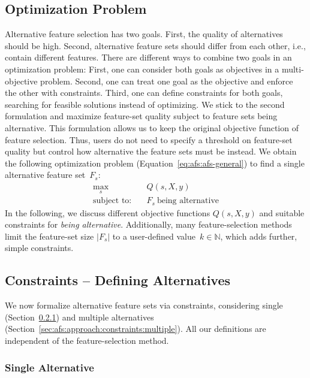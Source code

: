 \documentclass[iicol, sn-basic, Numbered]{sn-jnl} %
\theoremstyle{plain}
\theoremstyle{definition}
\begin{document}
\subsection{Optimization Problem}
\label{sec:afs:approach:problem}

Alternative feature selection has two goals.
First, the quality of alternatives should be high.
Second, alternative feature sets should differ from each other, i.e., contain different features.
There are different ways to combine two goals in an optimization problem:
First, one can consider both goals as objectives in a multi-objective problem.
Second, one can treat one goal as the objective and enforce the other with constraints.
Third, one can define constraints for both goals, searching for feasible solutions instead of optimizing. 
We stick to the second formulation and maximize feature-set quality subject to feature sets being alternative.
This formulation allows us to keep the original objective function of feature selection.
Thus, users do not need to specify a threshold on feature-set quality but control how alternative the feature sets must be instead.
We obtain the following optimization problem (Equation~\ref{eq:afs:afs-general}) to find a single alternative feature set~$F_s$:
%
\begin{equation}
	\begin{aligned}
		\max_s &\quad Q(s,X,y) \\
		\text{subject to:} &\quad F_s~\text{being alternative}
	\end{aligned}
	\label{eq:afs:afs-general}
\end{equation}
%
In the following, we discuss different objective functions $Q(s,X,y)$ and suitable constraints for \emph{being alternative}.
Additionally, many feature-selection methods limit the feature-set size $|F_s|$ to a user-defined value~$k \in \mathbb{N}$, which adds further, simple constraints.

\subsection{Constraints -- Defining Alternatives}
\label{sec:afs:approach:constraints}

We now formalize alternative feature sets via constraints, considering single (Section~\ref{sec:afs:approach:constraints:single}) and multiple alternatives (Section~\ref{sec:afs:approach:constraints:multiple}).
All our definitions are independent of the feature-selection method.

\subsubsection{Single Alternative}
\label{sec:afs:approach:constraints:single}
\end{document}
